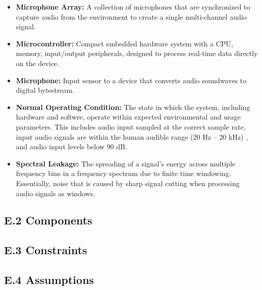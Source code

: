 \documentclass[12pt]{article}
\theoremstyle{definition}
\begin{document}
\begin{itemize}
    \item \textbf{Microphone Array:}\label{def:microphone_array} A collection of 
    microphones that are synchronized to capture audio from the 
    environment to create a single multi-channel audio signal.

    \item \textbf{Microcontroller:}\label{def:microcontroller} Compact embedded
    hardware system with a CPU, memory, input/output peripherals, designed to
    process real-time data directly on the device.

    \item \textbf{Microphone:}\label{def:microphone} Input sensor to a device
    that converts audio soundwaves to digital bytestream.

    \item \textbf{Normal Operating Condition:}
    \label{def:normal_operation_condition} The state in which the system,
    including hardware and softwre, operate within expected environmental and
    usage parameters. This includes audio input sampled at the correct sample
    rate, input audio signals are within the human audible range
    (20 Hz – 20 kHz) \cite{Neuroscience2001}, and audio input levels below
    90 dB.

    \item \textbf{Spectral Leakage:} \label{def:spectral_leakage} 
    The spreading of a signal's energy across multiple frequency bins in a
    frequency spectrum due to finite time windowing. Essentially, noise that is
    caused by sharp signal cutting when processing audio signals as windows.

\end{itemize}

\subsection{E.2 Components}

\subsection{E.3 Constraints}

\subsection{E.4 Assumptions}
\end{document}
